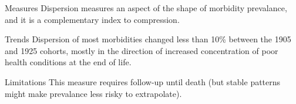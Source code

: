 \documentclass[20pt]{beamer}
\begin{document}
\begin{frame}
\Large
\begin{block}{\Large Measures}
Dispersion measures an aspect of the shape of morbidity prevalance, and it is a
complementary index to compression. 
\end{block}
\pause
\begin{block}{\Large Trends}
Dispersion of most morbidities changed less than 10\% between the 1905 and 1925
cohorts, mostly in the direction of increased concentration of poor health
conditions at the end of life.
\end{block}
\pause
\begin{block}{\Large Limitations}
This measure requires follow-up until death (but stable patterns might make
prevalance less risky to extrapolate). 
\end{block}
\pause
\color{thankscolor}{Thanks!}
\end{frame}

\end{document}
